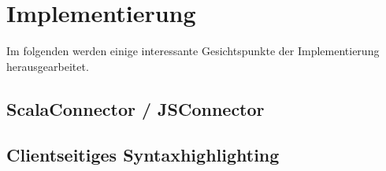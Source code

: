 \chapter{Implementierung}
\label{sec:imp}

Im folgenden werden einige interessante Gesichtspunkte der Implementierung herausgearbeitet.


\section{ScalaConnector / JSConnector}
\label{sec:jsc}

\section{Clientseitiges Syntaxhighlighting}

\section{}
